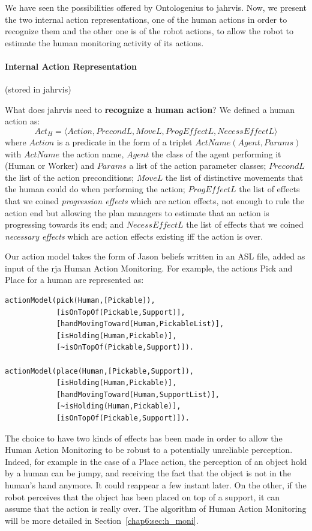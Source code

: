 \documentclass[a4paper,11pt,twoside]{StyleThese}
\begin{document}
We have seen the possibilities offered by Ontologenius to \acrshort{jahrvis}. Now, we present the two internal action representations, one of the human actions in order to recognize them and the other one is of the robot actions, to allow the robot to estimate the human monitoring activity of its actions. 

\paragraph{Internal Action Representation}\label{chap6:par:act_rep}(\ie stored in \acrshort{jahrvis})\mbox{}

\bigskip
What does \acrshort{jahrvis} need to \textbf{recognize a human action}? We defined a human action as: 
\[Act_H=\langle Action,PrecondL,MoveL,ProgEffectL,NecessEffectL\rangle\] where $Action$ is a predicate in the form of a triplet $ActName(Agent,Params)$ with $ActName$ the action name, $Agent$ the class of the agent performing it (\eg Human or Worker) and $Params$ a list of the action parameter classes; $PrecondL$ the list of the action preconditions; $MoveL$ the list of distinctive movements that the human could do when performing the action; $ProgEffectL$ the list of effects that we coined \textit{progression effects} which are action effects, not enough to rule the action end but allowing the plan managers to estimate that an action is progressing towards its end; and $NecessEffectL$ the list of effects that we coined \textit{necessary effects} which are action effects existing iff the action is over.

Our action model takes the form of Jason beliefs written in an ASL file, added as input of the \acrshort{rja} Human Action Monitoring. For example, the actions Pick and Place for a human are represented as:
\begin{lstlisting}[style=aslDef]
actionModel(pick(Human,[Pickable]),
			[isOnTopOf(Pickable,Support)],
			[handMovingToward(Human,PickableList)],
			[isHolding(Human,Pickable)],
			[~isOnTopOf(Pickable,Support)]).

actionModel(place(Human,[Pickable,Support]),
			[isHolding(Human,Pickable)],
			[handMovingToward(Human,SupportList)],
			[~isHolding(Human,Pickable)],
			[isOnTopOf(Pickable,Support)]).
\end{lstlisting}

The choice to have two kinds of effects has been made in order to allow the Human Action Monitoring to be robust to a potentially unreliable perception. Indeed, for example in the case of a Place action, the perception of an object hold by a human can be jumpy, and receiving the fact that the object is not in the human's hand anymore. It could reappear a few instant later. On the other, if the robot perceives that the object has been placed on top of a support, it can assume that the action is really over. The algorithm of Human Action Monitoring will be more detailed in Section~\ref{chap6:sec:h_moni}.
\end{document}
